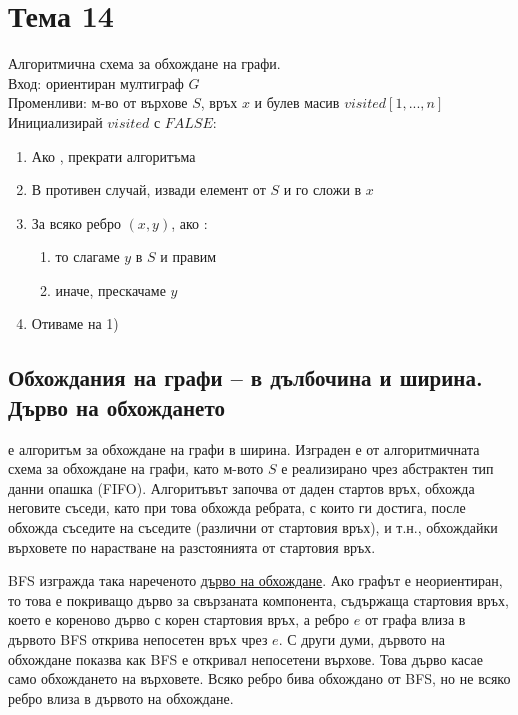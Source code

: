 \section{Тема 14}

Алгоритмична схема за обхождане на графи. \\
Вход: ориентиран мултиграф \(G\) \\
Променливи: м-во от върхове \(S\), връх \(x\) и булев масив \(visited[1, ..., n]\) \\
Инициализирай \(visited\) с \(FALSE\): 
\begin{enumerate}
    \item Ако , прекрати алгоритъма
    \item В противен случай, извади елемент от \(S\) и го сложи в \(x\)
    \item За всяко ребро \((x, y)\), ако :
    \begin{enumerate}
        \item то слагаме \(y\) в \(S\) и правим 
        \item иначе, прескачаме \(y\)
    \end{enumerate}
    \item Отиваме на 1)
\end{enumerate}

\subsection{Обхождания на графи – в дълбочина и ширина. Дърво на обхождането}
 е алгоритъм за обхождане на графи в ширина. Изграден е от алгоритмичната 
схема за обхождане на графи, като м-вото \(S\) е реализирано чрез абстрактен тип данни опашка (FIFO). 
Алгоритъвът започва от даден стартов връх, обхожда неговите съседи, като при това обхожда ребрата, с 
които ги достига, после обхожда съседите на съседите (различни от стартовия връх), и т.н., обхождайки 
върховете по нарастване на разстоянията от стартовия връх.

BFS изгражда така нареченото \underline{дърво на обхождане}. Ако графът е неориентиран, то това е 
покриващо дърво за свързаната компонента, съдържаща стартовия връх, което е кореново дърво с корен 
стартовия връх, а ребро \(e\) от графа влиза в дървото \totw BFS открива непосетен връх чрез \(e\). 
С други думи, дървото на обхождане показва как BFS е откривал непосетени върхове. Това дърво касае само 
обхождането на върховете. Всяко ребро бива обхождано от BFS, но не всяко ребро влиза в дървото на 
обхождане.


